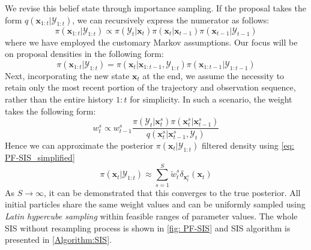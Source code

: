 We revise this belief state through importance sampling. If the proposal takes the form $q(\boldsymbol{x}_{1:t}|\mathcal{Y}_{1:t})$, we can recursively express the numerator as follows:
\begin{equation}
    \label{eq: PF-recursive}
    \pi(\boldsymbol{x}_{1:t}|\mathcal{Y}_{1:t})
    \propto 
    \pi(\mathcal{Y}_{t}|\boldsymbol{x}_{t})
    \pi(\boldsymbol{x}_{t}|\boldsymbol{x}_{t-1})
    \pi(\boldsymbol{x}_{t-1}|\mathcal{Y}_{t-1})
\end{equation}
where we have employed the customary Markov assumptions. Our focus will be on proposal densities in the following form:
\begin{equation}
    \label{eq: PF-recursive_2}
\pi(\boldsymbol{x}_{1:t}|\mathcal{Y}_{1:t})
=
\pi(\boldsymbol{x}_{t}|\boldsymbol{x}_{1:t-1},\mathcal{Y}_{1:t})
\pi(\boldsymbol{x}_{1:t-1}|\mathcal{Y}_{1:t-1})
\end{equation}
Next, incorporating the new state $\boldsymbol{x}_{t}$ at the end, we assume the necessity to retain only the most recent portion of the trajectory and observation sequence, rather than the entire history $1:t$ for simplicity. In such a scenario, the weight takes the following form:
\begin{equation}
    \label{eq: PF-modified_weight}
    w_{t}^{s}
    \propto 
    w_{t-1}^{s}
    \frac{\pi(\mathcal{Y}_{t}|\boldsymbol{x}_{t}^{s})     \pi(\boldsymbol{x}_{t}^{s}|\boldsymbol{x}_{t-1}^{s})}
    {q(\boldsymbol{x}_{t}^{s}|\boldsymbol{x}_{t-1}^{s},\mathcal{Y}_{t})} 
\end{equation}
Hence we can approximate the posterior $\pi(\boldsymbol{x}_{t}|\mathcal{Y}_{1:t})$ filtered density using \cref{eq: PF-SIS_simplified}
\begin{equation}
    \label{eq: PF-SIS_simplified}
    \pi(\boldsymbol{x}_{t}|\mathcal{Y}_{1:t})
    \approx 
    \sum_{s=1}^{S} 
    \tilde{w}_{t}^{s}
    \delta_{\boldsymbol{x}_{t}^{s}}(\boldsymbol{x}_{t})
\end{equation}
As $S \rightarrow \infty$, it can be demonstrated that this converges to the true posterior. All initial particles share the same weight values and can be uniformly sampled using \textit{Latin hypercube sampling} within feasible ranges of parameter values. The whole \acrshort{SIS} without resampling process is shown in \cref{fig: PF-SIS} and \acrshort{SIS} algorithm is presented in \ref{Algorithm:SIS}.
